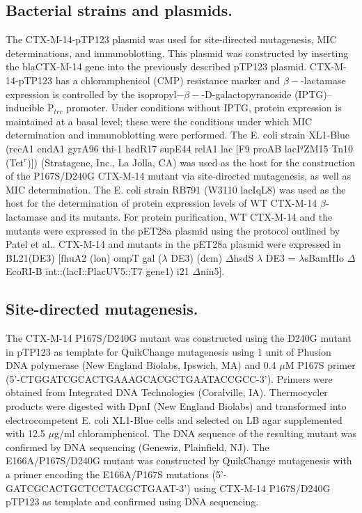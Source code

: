 \documentclass[../main.tex]{subfiles}
\begin{document}
    \subsection{Bacterial strains and plasmids.}
        The CTX-M-14-pTP123 plasmid was used for site-directed mutagenesis, MIC determinations, and immunoblotting. This plasmid was constructed by inserting the blaCTX-M-14 gene into the previously described pTP123 plasmid. CTX-M-14-pTP123 has a chloramphenicol (CMP) resistance marker and $\beta-$-lactamase expression is controlled by the isopropyl$-\beta-$-D-galactopyranoside (IPTG)–inducible P$_{trc}$ promoter\cite{petrosino_contributions_1999}. Under conditions without IPTG, protein expression is maintained at a basal level; these were the conditions under which MIC determination and immunoblotting were performed. The E. coli strain XL1-Blue (recA1 endA1 gyrA96 thi-1 hsdR17 supE44 relA1 lac [F9 proAB lacI$^q$ZM15 Tn10 (Tet$^r$)]) (Stratagene, Inc., La Jolla, CA) was used as the host for the construction of the P167S/D240G CTX-M-14 mutant via site-directed mutagenesis, as well as MIC determination. The E. coli strain RB791 (W3110 lacIqL8) was used as the host for the determination of protein expression levels of WT CTX-M-14 $\beta$-lactamase and its mutants\cite{amann_vectors_1983}. For protein purification, WT CTX-M-14 and the mutants were expressed in the pET28a plasmid using the protocol outlined by Patel et al.\cite{patel_characterization_2015}. CTX-M-14 and mutants in the pET28a plasmid were expressed in BL21(DE3) [fhuA2 (lon) ompT gal ($\lambda$ DE3) (dcm) $\Delta$hsdS $\lambda$ DE3 = $\lambda$sBamHIo $\Delta$EcoRI-B int::(lacI::PlacUV5::T7 gene1) i21 $\Delta$nin5]\cite{studier_use_1986}.

    \subsection{Site-directed mutagenesis.}
        The CTX-M-14 P167S/D240G mutant was constructed using the D240G mutant in pTP123 as template for QuikChange mutagenesis using 1 unit of Phusion DNA polymerase (New England Biolabs, Ipswich, MA) and 0.4 $\mu$M P167S primer (5'-CTGGATCGCACTGAAAGCACGCTGAATACCGCC-3')\cite{patel_characterization_2015}. Primers were obtained from Integrated DNA Technologies (Coralville, IA). Thermocycler products were digested with DpnI (New England Biolabs) and transformed into electrocompetent E. coli XL1-Blue cells and selected on LB agar supplemented with 12.5 $\mu$g/ml chloramphenicol. The DNA sequence of the resulting mutant was confirmed by DNA sequencing (Genewiz, Plainfield, NJ). The E166A/P167S/D240G mutant was constructed by QuikChange mutagenesis with a primer encoding the E166A/P167S mutations (5'-GATCGCACTGCTCCTACGCTGAAT-3') using CTX-M-14 P167S/D240G pTP123 as template and confirmed using DNA sequencing.
\end{document}
